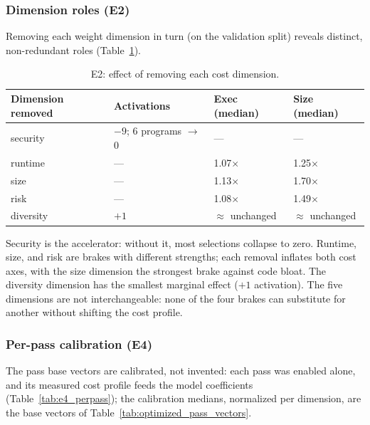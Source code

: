 \documentclass[5p,times,authoryear]{elsarticle}
\theoremstyle{plain}
\theoremstyle{definition}
\theoremstyle{remark}
\begin{document}
\subsubsection{Dimension roles (E2)}
Removing each weight dimension in turn (on the validation split) reveals distinct,
non-redundant roles (Table~\ref{tab:e2_roles}).

\begin{table}[!t]
\centering
\footnotesize
\caption{E2: effect of removing each cost dimension.}
\label{tab:e2_roles}
\begin{tabular}{llll}
\toprule
Dimension removed & Activations & Exec (median) & Size (median) \\
\midrule
security & $-9$; 6 programs $\to$ 0 & --- & --- \\
runtime & --- & 1.07$\times$ & 1.25$\times$ \\
size & --- & 1.13$\times$ & 1.70$\times$ \\
risk & --- & 1.08$\times$ & 1.49$\times$ \\
diversity & $+1$ & $\approx$ unchanged & $\approx$ unchanged \\
\bottomrule
\end{tabular}
\end{table}

Security is the accelerator: without it, most selections collapse to zero. Runtime,
size, and risk are brakes with different strengths; each removal inflates both cost
axes, with the size dimension the strongest brake against code bloat. The diversity
dimension has the smallest marginal effect ($+1$ activation). The five dimensions
are not interchangeable: none of the four brakes can substitute for another
without shifting the cost profile.

\subsubsection{Per-pass calibration (E4)}
The pass base vectors are calibrated, not invented: each pass was enabled alone, and
its measured cost profile feeds the model coefficients (Table~\ref{tab:e4_perpass});
the calibration medians, normalized per dimension, are the base vectors of
Table~\ref{tab:optimized_pass_vectors}.
\end{document}
